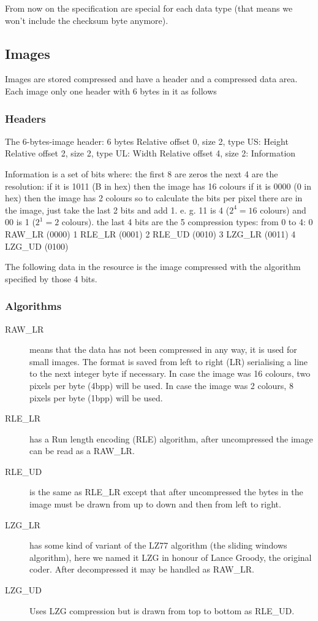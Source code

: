 \documentclass{article}
\begin{document}
 From now on the specification are special for each data type (that means
 we won't include the checksum byte anymore).

\subsection{Images}
 Images are stored compressed and have a header and a compressed data area.
 Each image only one header with 6 bytes in it as follows

\subsubsection{Headers} %
 The 6-bytes-image header: 6 bytes
  Relative offset 0, size 2, type US: Height
  Relative offset 2, size 2, type UL: Width
  Relative offset 4, size 2: Information

 Information is a set of bits where:
  the first 8 are zeros
  the next 4 are the resolution:
   if it is 1011 (B in hex) then the image has 16 colours
   if it is 0000 (0 in hex) then the image has 2 colours
   so to calculate the bits per pixel there are in the image, just take the
   last 2 bits and add 1. e. g. 11 is 4 ($2^4=16$ colours) and
  00 is 1 ($2^1=2$ colours).
  the last 4 bits are the 5 compression types:
   from 0 to 4:
   0 RAW\_LR (0000)
   1 RLE\_LR (0001)
   2 RLE\_UD (0010)
   3 LZG\_LR (0011)
   4 LZG\_UD (0100)

 The following data in the resource is the image compressed with the
 algorithm specified by those 4 bits.

\subsubsection{Algorithms} %

\begin{description}

\item[RAW\_LR]{means that the data has not been compressed in any way, it is used
        for small images.
        The format is saved from left to right (LR) serialising a line to
        the next integer byte if necessary. In case the image was 16
        colours, two pixels per byte (4bpp) will be used. In case the image
        was 2 colours, 8 pixels per byte (1bpp) will be used.
}
\item[RLE\_LR]{has a Run length encoding (RLE) algorithm, after uncompressed the
        image can be read as a RAW\_LR.}

\item[RLE\_UD]{is the same as RLE\_LR except that after uncompressed the bytes in
        the image must be drawn from up to down and then from left to right.}

\item[LZG\_LR]{ has some kind of variant of the LZ77 algorithm (the sliding windows
        algorithm), here we named it LZG in honour of Lance Groody, the
        original coder.
        After decompressed it may be handled as RAW\_LR.}
\item[LZG\_UD]{Uses LZG compression but is drawn from top to bottom as RLE\_UD.}

\end{description}
\end{document}
